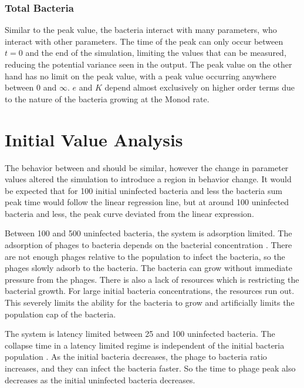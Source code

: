 \subsubsection{Total Bacteria}
Similar to the peak value, the bacteria interact with many parameters, who interact with other parameters. 
The time of the peak can only occur between $t=0$ and the end of the simulation, limiting the values that can be measured, reducing the potential variance seen in the output. 
The peak value on the other hand has no limit on the peak value, with a peak value occurring anywhere between 0 and $\infty$. 
$e$ and $K$ depend almost exclusively on higher order terms due to the nature of the bacteria growing at the Monod rate. 

\section{Initial Value Analysis}
The behavior between  and  should be similar, however the change in parameter values altered the simulation to introduce a region in behavior change. 
It would be expected that for 100 initial uninfected bacteria and less the bacteria sum peak time would follow the linear regression line, but at around 100 uninfected bacteria and less, the peak curve deviated from the linear expression. 

Between 100 and 500 uninfected bacteria, the system is adsorption limited. 
The adsorption of phages to bacteria depends on the bacterial concentration \cite{mullaExtremeDiversityPhage2024}. 
There are not enough phages relative to the population to infect the bacteria, so the phages slowly adsorb to the bacteria. 
The bacteria can grow without immediate pressure from the phages. 
There is also a lack of resources which is restricting the bacterial growth. 
For large initial bacteria concentrations, the resources run out. 
This severely limits the ability for the bacteria to grow and artificially limits the population cap of the bacteria. 

The system is latency limited between 25 and 100 uninfected bacteria. 
The collapse time in a latency limited regime is independent of the initial bacteria population \cite{mullaExtremeDiversityPhage2024}. 
As the initial bacteria decreases, the phage to bacteria ratio increases, and they can infect the bacteria faster. 
So the time to phage peak also decreases as the initial uninfected bacteria decreases. 

